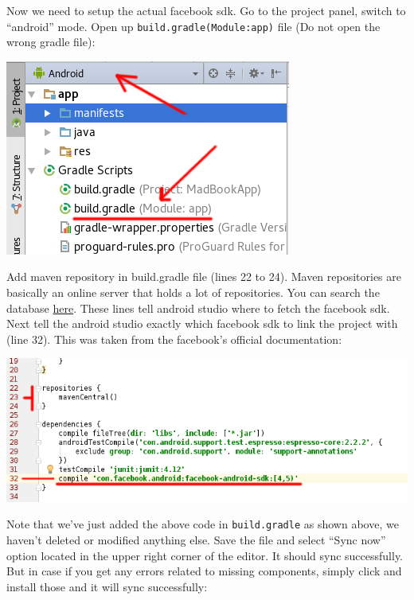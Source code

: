 Now we need to setup the actual facebook sdk. Go to the project panel, switch to ``android'' mode. Open up \texttt{build.gradle(Module:app)} file (Do not open the wrong gradle file):

\begin{center}
	\includegraphics[scale=\SourceCodeScale]{chapters/ch12/images/12}
\end{center}

Add maven repository in build.gradle file (lines 22 to 24). Maven repositories are basically an online server that holds a lot of repositories. You can search the database \href{http://search.maven.org/}{here}. These lines tell android studio where to fetch the facebook sdk. Next tell the android studio exactly which facebook sdk to link the project with (line 32). This was taken from the facebook's official documentation:

\begin{center}
	\includegraphics[scale=\SourceCodeScale]{chapters/ch12/images/13}
\end{center}

Note that we've just added the above code in \texttt{build.gradle} as shown above, we haven't deleted or modified anything else. Save the file and select ``Sync now'' option located in the upper right corner of the editor. It should sync successfully. But in case if you get any errors related to missing components, simply click and install those and it will sync successfully:

